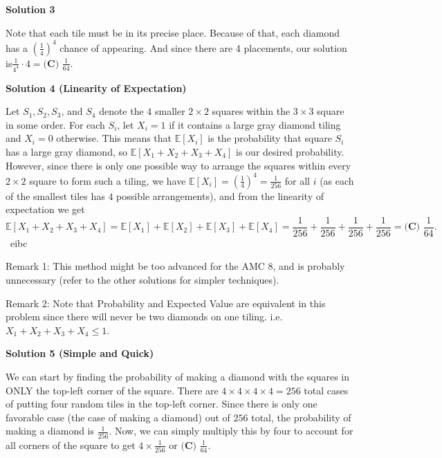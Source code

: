 \begin{enumerate}
 



\textbf{Solution 3}

Note that each tile must be in its precise place. Because of that, each diamond has a $\left(\frac14\right)^4$ chance of appearing. And since there are 4 placements, our solution is$\frac{1}{4^4} \cdot 4 = \boxed{\textbf{(C) } \frac{1}{64}}$.

 



\textbf{Solution 4 (Linearity of Expectation)}

Let $S_1, S_2, S_3$, and $S_4$ denote the $4$ smaller $2 \times 2$ squares within the $3 \times 3$ square in some order. For each $S_i$, let $X_i = 1$ if it contains a large gray diamond tiling and $X_i = 0$ otherwise. This means that $\mathbb{E}[X_i]$ is the probability that square $S_i$ has a large gray diamond, so $\mathbb{E}[X_1 + X_2 + X_3 + X_4]$ is our desired probability. However, since there is only one possible way to arrange the squares within every $2 \times 2$ square to form such a tiling, we have $\mathbb{E}[X_i] = (\frac{1}{4})^4 = \frac{1}{256}$ for all $i$ (as each of the smallest tiles has $4$ possible arrangements), and from the linearity of expectation we get 
 \[\mathbb{E}[X_1 + X_2 + X_3 + X_4] = \mathbb{E}[X_1] + \mathbb{E}[X_2] + \mathbb{E}[X_3] + \mathbb{E}[X_4] = \frac{1}{256} + \frac{1}{256} + \frac{1}{256} + \frac{1}{256} = \boxed{\textbf{(C) } \frac{1}{64}}.\]~eibc

 Remark 1: This method might be too advanced for the AMC 8, and is probably unnecessary (refer to the other solutions for simpler techniques).

 Remark 2: Note that Probability and Expected Value are equivalent in this problem since there will never be two diamonds on one tiling. i.e. $X_1 + X_2 + X_3 + X_4 \le 1$.

 



\textbf{Solution 5 (Simple and Quick)}

We can start by finding the probability of making a diamond with the squares in ONLY the top-left corner of the square. There are $4\times 4\times 4\times 4 = 256$ total cases of putting four random tiles in the top-left corner. Since there is only one favorable case (the case of making a diamond) out of $256$ total, the probability of making a diamond is $\frac{1}{256}.$ Now, we can simply multiply this by four to account for all corners of the square to get $4\times \frac{1}{256}$ or $\boxed{\textbf{(C) } \frac{1}{64}}.$




\end{enumerate}
